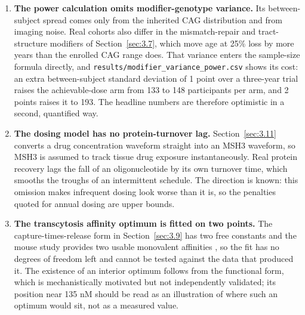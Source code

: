 \documentclass[conference]{IEEEtran}
\begin{document}
\begin{enumerate}
\item \textbf{The power calculation omits modifier-genotype variance.} Its between-subject spread comes only from the inherited CAG distribution and from imaging noise. Real cohorts also differ in the mismatch-repair and tract-structure modifiers of Section~\ref{sec:3.7}, which move age at 25\% loss by more years than the enrolled CAG range does. That variance enters the sample-size formula directly, and \texttt{results/\allowbreak{}modifier\_\allowbreak{}variance\_\allowbreak{}power.\allowbreak{}csv} shows its cost: an extra between-subject standard deviation of 1 point over a three-year trial raises the achievable-dose arm from 133 to 148 participants per arm, and 2 points raises it to 193. The headline numbers are therefore optimistic in a second, quantified way.
\item \textbf{The dosing model has no protein-turnover lag.} Section~\ref{sec:3.11} converts a drug concentration waveform straight into an MSH3 waveform, so MSH3 is assumed to track tissue drug exposure instantaneously. Real protein recovery lags the fall of an oligonucleotide by its own turnover time, which smooths the troughs of an intermittent schedule. The direction is known: this omission makes infrequent dosing look worse than it is, so the penalties quoted for annual dosing are upper bounds.
\item \textbf{The transcytosis affinity optimum is fitted on two points.} The capture-times-release form in Section~\ref{sec:3.9} has two free constants and the mouse study provides two usable monovalent affinities \cite{johnsen}, so the fit has no degrees of freedom left and cannot be tested against the data that produced it. The existence of an interior optimum follows from the functional form, which is mechanistically motivated but not independently validated; its position near 135 nM should be read as an illustration of where such an optimum would sit, not as a measured value.
\end{enumerate}
\end{document}
